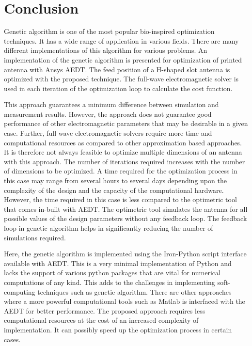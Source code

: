 \section{Conclusion}\label{c3sec_concl}
Genetic algorithm is one of the most popular bio-inspired optimization techniques. It has a wide range of application in various fields. There are many different implementations of this algorithm for various problems. An implementation of the genetic algorithm is presented for optimization of printed antenna with Ansys AEDT. The feed position of a H-shaped slot antenna is optimized with the proposed technique. The full-wave electromagnetic solver is used in each iteration of the optimization loop to calculate the cost function.

This approach guarantees a minimum difference between simulation and measurement results. However, the approach does not guarantee good performance of other electromagnetic parameters that may be desirable in a given case. Further, full-wave electromagnetic solvers require more time and computational resources as compared to other approximation based approaches. It is therefore not always feasible to optimize multiple dimensions of an antenna with this approach. The number of iterations required increases with the number of dimensions to be optimized. A time required for the optimization process in this case may range from several hours to several days depending upon the complexity of the design and the capacity of the computational hardware. However, the time required in this case is less compared to the optimetric tool that comes in-built with AEDT. The optimetric tool simulates the antenna for all possible values of the design parameters without any feedback loop. The feedback loop in genetic algorithm helps in significantly reducing the number of simulations required.

Here, the genetic algorithm is implemented using the Iron-Python script interface available with AEDT. This is a very minimal implementation of Python and lacks the support of various python packages that are vital for numerical computations of any kind. This  adds to the challenges in implementing soft-computing techniques such as genetic algorithm. There are other approaches where a more powerful computational tools such as Matlab is interfaced with the AEDT for better performance. The proposed approach requires less computational resources at the cost of an increased complexity of implementation. It can possibly speed up the optimization process in certain cases.
